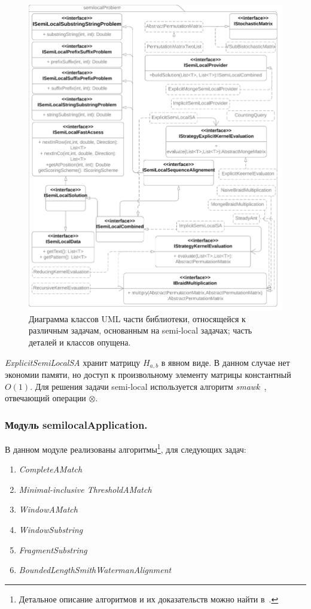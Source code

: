 \begin{figure}
  \centering
  \includegraphics[height=0.72\columnwidth,angle=90]{Mishin/figures/Library.png}
  \caption{Диаграмма классов UML части библиотеки, относящейся к различным задачам, основанным на  {semi-local} задачах; часть деталей и классов опущена.}\label{fig:libraryProblem}
\end{figure}

\emph{ExplicitSemiLocalSA} хранит матрицу $H_{a,b}$ в явном виде.
В данном случае нет экономии памяти, но доступ к произвольному элементу матрицы константный $O(1)$. 
Для решения задачи {semi-local} используется алгоритм \emph{smawk}~\cite{aggarwal1987geometric}, отвечающий операции  $\otimes$.








\subsubsection{Модуль semilocalApplication.}

В данном модуле реализованы алгоритмы\footnote{Детальное описание алгоритмов и их доказательств можно найти в~\cite{tiskin2006all}.}, для следующих задач:
\begin{enumerate}
    \item \emph{CompleteAMatch}
    \item \emph{Minimal-inclusive ThresholdAMatch}
    \item \emph{WindowAMatch}
    \item \emph{WindowSubstring}
    \item \emph{FragmentSubstring}
    \item \emph{BoundedLengthSmithWatermanAlignment}
\end{enumerate}

